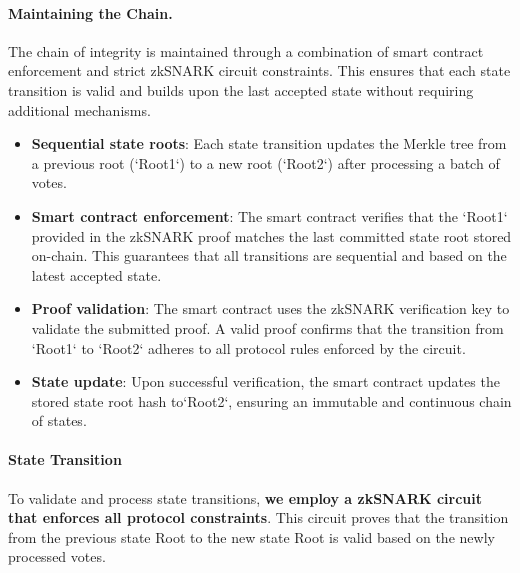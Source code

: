 \paragraph{Maintaining the Chain.}

The chain of integrity is maintained through a combination of smart contract enforcement and strict zkSNARK circuit constraints. This ensures that each state transition is valid and builds upon the last accepted state without requiring additional mechanisms.

\begin{itemize}
	\item \textbf{Sequential state roots}: Each state transition updates the Merkle tree from a previous root (`Root1`) to a new root (`Root2`) after processing a batch of votes.
	\item \textbf{Smart contract enforcement}: The smart contract verifies that the `Root1` provided in the zkSNARK proof matches the last committed state root stored on-chain. This guarantees that all transitions are sequential and based on the latest accepted state.
	\item \textbf{Proof validation}: The smart contract uses the zkSNARK verification key to validate the submitted proof. A valid proof confirms that the transition from `Root1` to `Root2` adheres to all protocol rules enforced by the circuit.
	\item \textbf{State update}: Upon successful verification, the smart contract updates the stored state root hash to`Root2`, ensuring an immutable and continuous chain of states.
\end{itemize}

\paragraph{State Transition}

To validate and process state transitions, \textbf{we employ a zkSNARK circuit that enforces all protocol constraints}. This circuit proves that the transition from the previous state Root to the new state Root is valid based on the newly processed votes.

\begin{figure}[H]
	\centering
\end{figure}

\begin{figure}[H]
	\centering
\end{figure}

